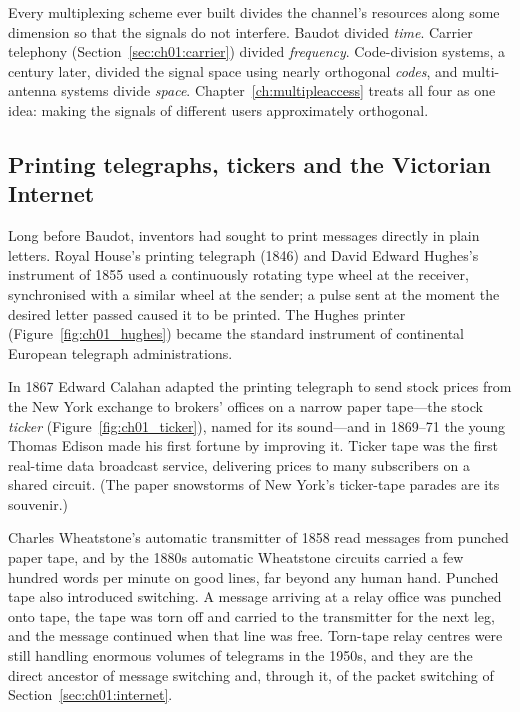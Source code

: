 \begin{keyidea}
Every multiplexing scheme ever built divides the channel's resources along some dimension so
that the signals do not interfere. Baudot divided \emph{time}. Carrier telephony
(Section~\ref{sec:ch01:carrier}) divided \emph{frequency}. Code-division systems, a century
later, divided the signal space using nearly orthogonal \emph{codes}, and multi-antenna systems
divide \emph{space}. Chapter~\ref{ch:multipleaccess} treats all four as one idea: making the
signals of different users approximately orthogonal.
\end{keyidea}

\subsection{Printing telegraphs, tickers and the Victorian Internet}


Long before Baudot, inventors had sought to print messages directly in plain letters. Royal House's
printing telegraph (1846) and David Edward Hughes's instrument of 1855 used a continuously rotating
type wheel at the receiver, synchronised with a similar wheel at the sender; a pulse sent at the
moment the desired letter passed caused it to be printed. The Hughes printer (Figure~\ref{fig:ch01_hughes}) became the standard
instrument of continental European telegraph administrations.

In 1867 Edward Calahan adapted the printing telegraph to send stock prices from the New York exchange
to brokers' offices on a narrow paper tape---the stock \emph{ticker}
(Figure~\ref{fig:ch01_ticker}), named for its sound---and in
1869--71 the young Thomas Edison made his first fortune by improving it. Ticker tape was the first
real-time data broadcast service, delivering prices to many subscribers on a shared circuit. (The
paper snowstorms of New York's ticker-tape parades are its souvenir.)

Charles Wheatstone's automatic transmitter of 1858 read messages from punched paper tape, and by the
1880s automatic Wheatstone circuits carried a few hundred words per minute on good lines, far beyond
any human hand. Punched tape also introduced  switching. A message arriving at
a relay office was punched onto tape, the tape was torn off and carried to the transmitter for the
next leg, and the message continued when that line was free. Torn-tape relay centres were still
handling enormous volumes of telegrams in the 1950s, and they are the direct ancestor of message
switching and, through it, of the packet switching of Section~\ref{sec:ch01:internet}.

